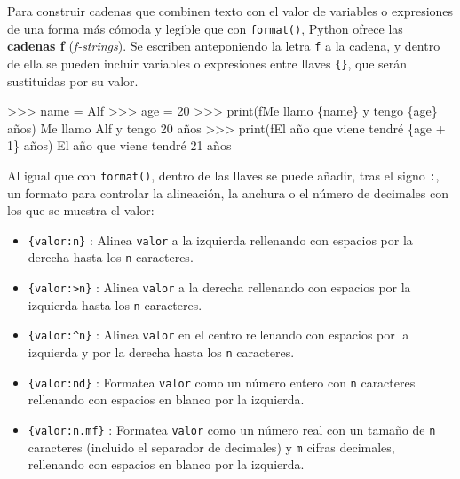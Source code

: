 \documentclass[
  spanish,
  a4paper,
]{scrreport}
\newenvironment{Shaded}{\begin{snugshade}}{\end{snugshade}}
\newcommand{\BuiltInTok}[1]{\textcolor[rgb]{0.00,0.23,0.31}{#1}}
\newcommand{\DecValTok}[1]{\textcolor[rgb]{0.68,0.00,0.00}{#1}}
\newcommand{\NormalTok}[1]{\textcolor[rgb]{0.00,0.23,0.31}{#1}}
\newcommand{\OperatorTok}[1]{\textcolor[rgb]{0.37,0.37,0.37}{#1}}
\newcommand{\SpecialCharTok}[1]{\textcolor[rgb]{0.37,0.37,0.37}{#1}}
\newcommand{\SpecialStringTok}[1]{\textcolor[rgb]{0.13,0.47,0.30}{#1}}
\newcommand{\StringTok}[1]{\textcolor[rgb]{0.13,0.47,0.30}{#1}}
\providecommand{\tightlist}{%
  \setlength{\itemsep}{0pt}\setlength{\parskip}{0pt}}
\begin{document}
Para construir cadenas que combinen texto con el valor de variables o
expresiones de una forma más cómoda y legible que con \texttt{format()},
Python ofrece las \textbf{cadenas f} (\emph{f-strings}). Se escriben
anteponiendo la letra \texttt{f} a la cadena, y dentro de ella se pueden
incluir variables o expresiones entre llaves \texttt{\{\}}, que serán
sustituidas por su valor.

\begin{Shaded}
\begin{Highlighting}[]
\OperatorTok{\textgreater{}\textgreater{}\textgreater{}}\NormalTok{ name }\OperatorTok{=} \StringTok{\textquotesingle{}Alf\textquotesingle{}}
\OperatorTok{\textgreater{}\textgreater{}\textgreater{}}\NormalTok{ age }\OperatorTok{=} \DecValTok{20}
\OperatorTok{\textgreater{}\textgreater{}\textgreater{}} \BuiltInTok{print}\NormalTok{(}\SpecialStringTok{f\textquotesingle{}Me llamo }\SpecialCharTok{\{}\NormalTok{name}\SpecialCharTok{\}}\SpecialStringTok{ y tengo }\SpecialCharTok{\{}\NormalTok{age}\SpecialCharTok{\}}\SpecialStringTok{ años\textquotesingle{}}\NormalTok{)}
\NormalTok{Me llamo Alf y tengo }\DecValTok{20}\NormalTok{ años}
\OperatorTok{\textgreater{}\textgreater{}\textgreater{}} \BuiltInTok{print}\NormalTok{(}\SpecialStringTok{f\textquotesingle{}El año que viene tendré }\SpecialCharTok{\{}\NormalTok{age }\OperatorTok{+} \DecValTok{1}\SpecialCharTok{\}}\SpecialStringTok{ años\textquotesingle{}}\NormalTok{)}
\NormalTok{El año que viene tendré }\DecValTok{21}\NormalTok{ años}
\end{Highlighting}
\end{Shaded}

Al igual que con \texttt{format()}, dentro de las llaves se puede
añadir, tras el signo \texttt{:}, un formato para controlar la
alineación, la anchura o el número de decimales con los que se muestra
el valor:

\begin{itemize}
\tightlist
\item
  \texttt{\{valor:n\}} : Alinea \texttt{valor} a la izquierda rellenando
  con espacios por la derecha hasta los \texttt{n} caracteres.
\item
  \texttt{\{valor:\textgreater{}n\}} : Alinea \texttt{valor} a la
  derecha rellenando con espacios por la izquierda hasta los \texttt{n}
  caracteres.
\item
  \texttt{\{valor:\^{}n\}} : Alinea \texttt{valor} en el centro
  rellenando con espacios por la izquierda y por la derecha hasta los
  \texttt{n} caracteres.
\item
  \texttt{\{valor:nd\}} : Formatea \texttt{valor} como un número entero
  con \texttt{n} caracteres rellenando con espacios en blanco por la
  izquierda.
\item
  \texttt{\{valor:n.mf\}} : Formatea \texttt{valor} como un número real
  con un tamaño de \texttt{n} caracteres (incluido el separador de
  decimales) y \texttt{m} cifras decimales, rellenando con espacios en
  blanco por la izquierda.
\end{itemize}
\end{document}
